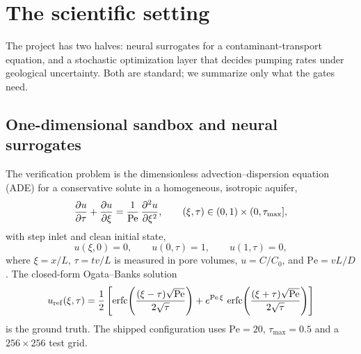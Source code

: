 \section{The scientific setting}
\label{sec:case}

The project has two halves: neural surrogates for a contaminant-transport
equation, and a stochastic optimization layer that decides pumping rates under
geological uncertainty. Both are standard; we summarize only what the gates
need.

\subsection{One-dimensional sandbox and neural surrogates}
\label{sec:case-1d}

The verification problem is the dimensionless advection--dispersion equation
(ADE) for a conservative solute in a homogeneous, isotropic aquifer,
\begin{equation}
\frac{\partial u}{\partial \tau}+\frac{\partial u}{\partial \xi}
=\frac{1}{\mathrm{Pe}}\,\frac{\partial^{2} u}{\partial \xi^{2}},
\qquad (\xi,\tau)\in(0,1)\times(0,\tau_{\max}],
\label{eq:ade}
\end{equation}
with step inlet and clean initial state,
\begin{equation}
u(\xi,0)=0,\qquad u(0,\tau)=1,\qquad u(1,\tau)=0,
\label{eq:bc}
\end{equation}
where $\xi=x/L$, $\tau=tv/L$ is measured in pore volumes, $u=C/C_0$, and
$\mathrm{Pe}=vL/D$. The closed-form Ogata--Banks solution
\citep{ogata1961solution}
\begin{equation}
u_{\mathrm{ref}}(\xi,\tau)=\frac12\left[
\operatorname{erfc}\!\left(\frac{(\xi-\tau)\sqrt{\mathrm{Pe}}}{2\sqrt{\tau}}\right)
+e^{\mathrm{Pe}\,\xi}\,
\operatorname{erfc}\!\left(\frac{(\xi+\tau)\sqrt{\mathrm{Pe}}}{2\sqrt{\tau}}\right)
\right]
\label{eq:ogata}
\end{equation}
is the ground truth. The shipped configuration uses $\mathrm{Pe}=20$,
$\tau_{\max}=0.5$ and a $256\times256$ test grid.

